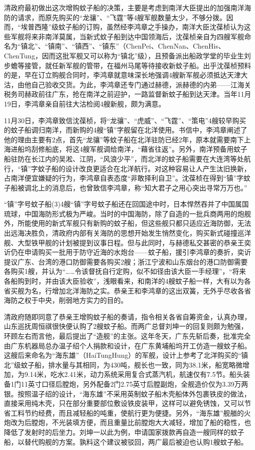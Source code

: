 \documentclass[12pt,UTF8]{ctexbook}
\begin{document}
清政府最初做出这次增购蚊子船的决策，主要是考虑到南洋大臣提出的加强南洋海防的请求，而原先购买的“龙骧”、“飞霆”等4艘军舰数量太少，不够分拨。因而，“埃普西隆”级蚊子船的订购，虽然经李鸿章之手操办，南洋大臣沈葆桢认为这些军舰将来非南洋莫属，当新式蚊子船到达中国领海后，沈葆桢亲自为四艘军舰命名为“镇北”、“镇南”、“镇西”、“镇东”（ChenPei、ChenNan、ChenHis、ChenTung，因而这批军舰又可以称为“镇北”级），且预备派出船政学堂的毕业生刘步蟾等接管，就任新军舰的管带，在福州马尾等待接收新蚊子船。出乎沈葆桢预料的是，早在订立购舰合同时，李鸿章就意味深长地强调4艘新军舰必须抵达天津大沽，由他自己验收交货。为此，李鸿章还专门通过赫德，派赫德的内弟——江海关税务司赫政前往广东，抢在南洋之前迎护，一路监督新蚊子船到达天津。当年11月19日，李鸿章亲自前往大沽检阅4艘新舰，颇为满意。

11月30日，李鸿章致信沈葆桢，将“龙骧”、“虎威”、“飞霆”、“策电”4艘较早购买的蚊子船调归南洋，而新购的4艘“镇”字舰留在北洋使用。书信中，李鸿章阐述了他的理由主要有2点，首先“龙骧”等蚊子船在北洋驻防已经2年，原本就需要南下上海进船坞刮修船底，将这4艘军舰调给南洋，“藉省往返”。另外，南洋预备用蚊子船驻防在长江内的吴淞、江阴，“风浪少平”，而北洋的蚊子船需要在大连湾等处航行，“镇”字蚊子船的设计改良更适合在北洋航行。对这种容易让人产生汰旧换新，占南洋便宜嫌疑的行为，李鸿章自表态度“非敢择利自卫”。沈葆桢在得到“镇”字蚊子船被调北上的消息后，也曾致信李鸿章，称“知大君子之用心突出寻常万万也。”

“镇”字号蚊子船(3)4艘“镇”字号蚊子船还在回国途中时，日本悍然吞并了中国属国琉球，中国海防形式极为严峻。当时的中国海防，除了自造的一批兵商两用的炮舰外，所能使用的新式军舰只有新购的蚊子船，但这些舰只都只适应近海防御，无法出远海决胜负，清政府内部有关海防的思想开始发生悄然变化，购买新式碰撞巡洋舰、大型铁甲舰的计划被提到议事日程。但与此同时，与赫德私交甚密的恭亲王奕䜣仍在申请购买一批用于防守近海的水炮台——蚊子船，援引李鸿章的奏折，奕䜣提议广东、台湾的港口防御需要各购买2艘；浙江宁波和山东烟台的港口防御需要各购买1艘，并认为“……令该督抚自行定购，似不如径由该大臣一手经理”，“将来各船购到时，并由该大臣验收”，浅眼看来，和南洋的4艘蚊子船一样，大有以为各省买舰为名，行增加北洋海防之实。恭亲王和李鸿章的这出双簧，无外乎尽收各省海防之权于中央，削弱地方实力的目的。

清政府随即同意了恭亲王增购蚊子船的奏请，指令相关各省自筹资金，认真办理，山东巡抚周恒祺很快便认购了2艘蚊子船。而两广总督刘坤一的回复则颇为勉强，环顾左右而言他，最后提出了“造舰”的主张。这年冬天，广东先斩后奏，批准完全由广东机器局总办温子绍个人捐款和设计，在广东黄埔船坞开工仿造一艘蚊子船。这艘后来命名为“海东雄”（HaiTungHung）的军舰，设计上参考了北洋购买的“镇北”级蚊子船，排水量与其相同，为430吨，舰长也一致，同为38.1米，船宽略微增加，为9.14米，吃水2.41米，动力系统采用复合式蒸汽机，航速仅有7.5节。船头装备1门11英寸口径后膛炮，另外配备2门2.75英寸后膛副炮，全舰造价仅为3.39万两银。按照温子绍的设计，“海东雄”不采用英制蚊子船木壳船体外包裹铁皮的做法，直接采用纯木壳，只在部分重要部位敷设铁皮装甲，这样可以避免锈蚀，又可以节省工料节约经费，而且减轻船的吨重，使航行更为便捷。另外，“海东雄”舰艏的火炮改为后膛炮，不光装填方便，而且重量比前膛炮大大减轻，增加了船的稳性，也降低了发射时的后坐力。刘坤一以此为例，申请国家拨款再自造一艘同样的蚊子船，以替代购舰的方案。孰料这个建议被驳回，两广最后被迫也认购1艘蚊子船。
\end{document}
